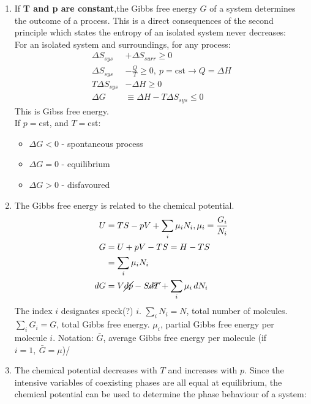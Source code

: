 \documentclass[a4paper, 11pt, normalem]{report}
\begin{document}
\begin{enumerate}
    \item If \textbf{T and p are constant},the Gibbs free energy $G$ of a system determines the outcome of a process.
        This is a direct consequences of the second principle which states the entropy of an isolated system never decreases: \\
        For an isolated system and surroundings, for any process:
        \begin{align}
            \Delta S_{sys} &+ \Delta S_{surr} \geq 0 \\
            \Delta S_{sys} &- \frac{Q}{T} \geq 0, ~ p = \text{cst} \to Q = \Delta H \\
            T\Delta S_{sys} &- \Delta H \geq 0 \\
            \Delta G &\equiv \Delta H - T\Delta S_{sys} \leq 0
        \end{align}
        This is Gibss free energy.\\
        If $p=$cst, and $T=$cst:
        \begin{itemize}
            \item $\Delta G < 0$ - spontaneous process
            \item $\Delta G = 0$ - equilibrium
            \item $\Delta G > 0$ - disfavoured
        \end{itemize}
    \item The Gibbs free energy is related to the chemical potential.
        \begin{align}
            U &= TS - pV + \sum_i \mu_iN_i, \mu_i = \frac{G_i}{N_i} \\
            G &= U + pV - TS = H - TS \\
              &= \sum_i\mu_iN_i \\
            dG &= V\cancel{dp} - S\cancel{dT} + \sum_i\mu_i\,dN_i
        \end{align}
        The index $i$ designates speck(?) $i$.
        $\sum_i N_i = N$, total number of molcules.
        $\sum_i G_i = G$, total Gibbs free energy.
        $\mu_i$, partial Gibbs free energy per molecule $i$.
        Notation: $\bar{G}$, average Gibbs free energy per molecule (if $i=1,~\bar{G} = \mu$)/
    \item The chemical potential decreases with $T$ and increases with $p$.
        Since the intensive variables of coexisting phases are all equal at equilibrium, the chemical potential can be used to determine the phase behaviour of a system:

\end{enumerate}
\end{document}
